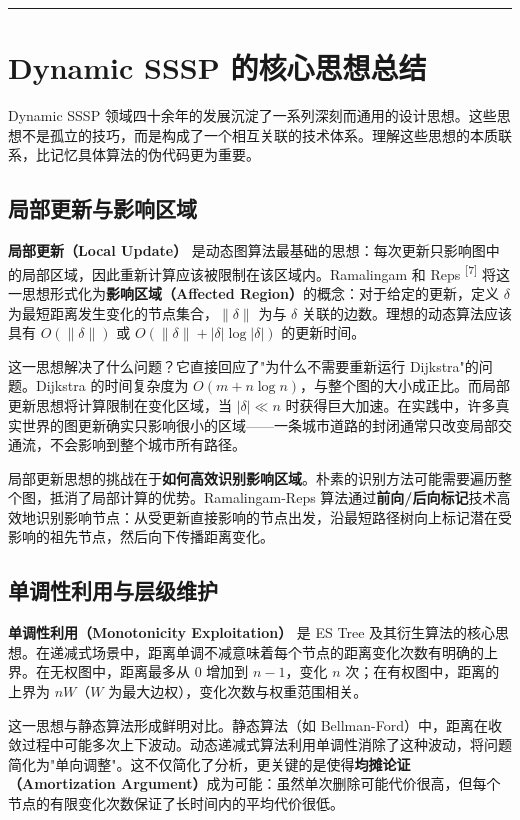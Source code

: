 \documentclass[12pt,a4paper]{ctexart}
\let\oldsection\section
\renewcommand{\section}{\clearpage\oldsection}
\begin{document}
\noindent\rule{\textwidth}{0.4pt}
\section{Dynamic SSSP 的核心思想总结}

Dynamic SSSP 领域四十余年的发展沉淀了一系列深刻而通用的设计思想。这些思想不是孤立的技巧，而是构成了一个相互关联的技术体系。理解这些思想的本质联系，比记忆具体算法的伪代码更为重要。

\subsection{局部更新与影响区域}

\textbf{局部更新（Local Update）} 是动态图算法最基础的思想：每次更新只影响图中的局部区域，因此重新计算应该被限制在该区域内。Ramalingam 和 Reps \textsuperscript{[7]}  将这一思想形式化为\textbf{影响区域（Affected Region）}的概念：对于给定的更新，定义 $\delta$ 为最短距离发生变化的节点集合，$\|\delta\|$ 为与 $\delta$ 关联的边数。理想的动态算法应该具有 $O(\|\delta\|)$ 或 $O(\|\delta\|+|\delta|\log|\delta|)$ 的更新时间。

这一思想解决了什么问题？它直接回应了"为什么不需要重新运行 Dijkstra"的问题。Dijkstra 的时间复杂度为 $O(m+n\log n)$，与整个图的大小成正比。而局部更新思想将计算限制在变化区域，当 $|\delta|\ll n$ 时获得巨大加速。在实践中，许多真实世界的图更新确实只影响很小的区域——一条城市道路的封闭通常只改变局部交通流，不会影响到整个城市所有路径。

局部更新思想的挑战在于\textbf{如何高效识别影响区域}。朴素的识别方法可能需要遍历整个图，抵消了局部计算的优势。Ramalingam-Reps 算法通过\textbf{前向/后向标记}技术高效地识别影响节点：从受更新直接影响的节点出发，沿最短路径树向上标记潜在受影响的祖先节点，然后向下传播距离变化。

\subsection{单调性利用与层级维护}

\textbf{单调性利用（Monotonicity Exploitation）} 是 ES Tree 及其衍生算法的核心思想。在递减式场景中，距离单调不减意味着每个节点的距离变化次数有明确的上界。在无权图中，距离最多从 0 增加到 $n-1$，变化 $n$ 次；在有权图中，距离的上界为 $nW$（$W$ 为最大边权），变化次数与权重范围相关。

这一思想与静态算法形成鲜明对比。静态算法（如 Bellman-Ford）中，距离在收敛过程中可能多次上下波动。动态递减式算法利用单调性消除了这种波动，将问题简化为"单向调整"。这不仅简化了分析，更关键的是使得\textbf{均摊论证（Amortization Argument）}成为可能：虽然单次删除可能代价很高，但每个节点的有限变化次数保证了长时间内的平均代价很低。
\end{document}
